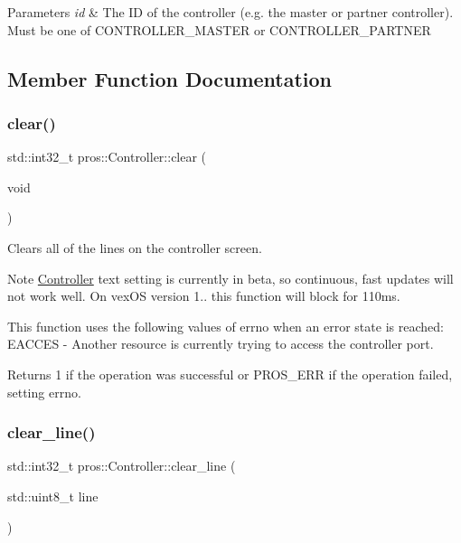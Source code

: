 \begin{DoxyParams}{Parameters}
{\em id} & The ID of the controller (e.\+g. the master or partner controller). Must be one of C\+O\+N\+T\+R\+O\+L\+L\+E\+R\+\_\+\+M\+A\+S\+T\+ER or C\+O\+N\+T\+R\+O\+L\+L\+E\+R\+\_\+\+P\+A\+R\+T\+N\+ER \\
\hline
\end{DoxyParams}


\subsection{Member Function Documentation}
\mbox{\label{classpros_1_1Controller_a49a332fe032c3aaf94e24bb3a51945e1}} 
\subsubsection{\texorpdfstring{clear()}{clear()}}
{\footnotesize\ttfamily std\+::int32\+\_\+t pros\+::\+Controller\+::clear (\begin{DoxyParamCaption}\item[{void}]{ }\end{DoxyParamCaption})}

Clears all of the lines on the controller screen.

\begin{DoxyNote}{Note}
\hyperlink{classpros_1_1Controller}{Controller} text setting is currently in beta, so continuous, fast updates will not work well. On vex\+OS version 1.. this function will block for 110ms.
\end{DoxyNote}
This function uses the following values of errno when an error state is reached\+: E\+A\+C\+C\+ES -\/ Another resource is currently trying to access the controller port.

\begin{DoxyReturn}{Returns}
1 if the operation was successful or P\+R\+O\+S\+\_\+\+E\+RR if the operation failed, setting errno. 
\end{DoxyReturn}
\mbox{\label{classpros_1_1Controller_a9f65f6c26d55619a658aa103d3532583}} 
\subsubsection{\texorpdfstring{clear\+\_\+line()}{clear\_line()}}
{\footnotesize\ttfamily std\+::int32\+\_\+t pros\+::\+Controller\+::clear\+\_\+line (\begin{DoxyParamCaption}\item[{std\+::uint8\+\_\+t}]{line }\end{DoxyParamCaption})}

